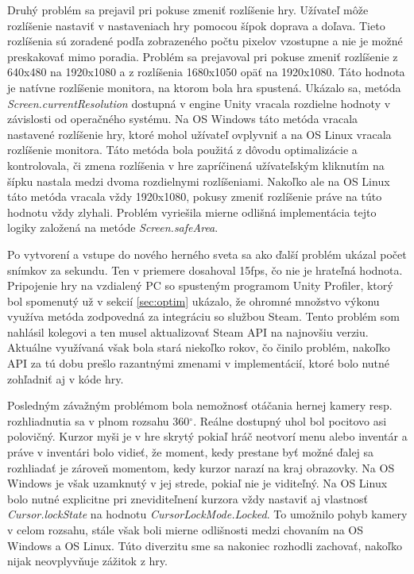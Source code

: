 \documentclass[slovak, bachelorpractice]{diploma}
\begin{document}
Druhý problém sa prejavil pri pokuse zmeniť rozlíšenie hry. Užívateľ môže rozlíšenie nastaviť v nastaveniach hry pomocou šípok doprava a doľava. Tieto rozlíšenia sú zoradené podľa zobrazeného počtu pixelov vzostupne a nie je možné preskakovať mimo poradia. Problém sa prejavoval pri pokuse zmeniť rozlíšenie z 640x480 na 1920x1080 a z rozlíšenia 1680x1050 opäť na 1920x1080. Táto hodnota je natívne rozlíšenie monitora, na ktorom bola hra spustená. Ukázalo sa, metóda \textit{Screen.currentResolution} dostupná v engine Unity vracala rozdielne hodnoty v závislosti od operačného systému. Na OS Windows táto metóda vracala nastavené rozlíšenie hry, ktoré mohol užívateľ ovplyvniť a na OS Linux vracala rozlíšenie monitora. Táto metóda bola použitá z dôvodu optimalizácie a kontrolovala, či zmena rozlíšenia v hre zapríčinená užívateľským kliknutím na šípku nastala medzi dvoma rozdielnymi rozlíšeniami. Nakoľko ale na OS Linux táto metóda vracala vždy 1920x1080, pokusy zmeniť rozlíšenie práve na túto hodnotu vždy zlyhali. Problém vyriešila mierne odlišná implementácia tejto logiky založená na metóde \textit{Screen.safeArea}.

Po vytvorení a vstupe do nového herného sveta sa ako ďalší problém ukázal počet snímkov za sekundu. Ten v priemere dosahoval 15fps, čo nie je hrateľná hodnota. Pripojenie hry na vzdialený PC so spusteným programom Unity Profiler, ktorý bol spomenutý už v sekcií \ref{sec:optim} ukázalo, že ohromné množstvo výkonu využíva metóda zodpovedná za integráciu so službou Steam. Tento problém som nahlásil kolegovi a ten musel aktualizovať Steam API na najnovšiu verziu. Aktuálne využívaná však bola stará niekoľko rokov, čo činilo problém, nakoľko API za tú dobu prešlo razantnými zmenami v implementácií, ktoré bolo nutné zohľadniť aj v kóde hry.

Posledným závažným problémom bola nemožnosť otáčania hernej kamery resp. rozhliadnutia sa v plnom rozsahu 360$^{\circ}$. Reálne dostupný uhol bol pocitovo asi polovičný. Kurzor myši je v hre skrytý pokiaľ hráč neotvorí menu alebo inventár a práve v inventári bolo vidieť, že moment, kedy prestane byť možné ďalej sa rozhliadať je zároveň momentom, kedy kurzor narazí na kraj obrazovky. Na OS Windows je však uzamknutý v jej strede, pokiaľ nie je viditeľný. Na OS Linux bolo nutné explicitne pri zneviditeľnení kurzora vždy nastaviť aj vlastnosť \textit{Cursor.lockState} na hodnotu \textit{CursorLockMode.Locked}. To umožnilo pohyb kamery v celom rozsahu, stále však boli mierne odlišnosti medzi chovaním na OS Windows a OS Linux. Túto diverzitu sme sa nakoniec rozhodli zachovať, nakoľko nijak neovplyvňuje zážitok z hry.
\end{document}
